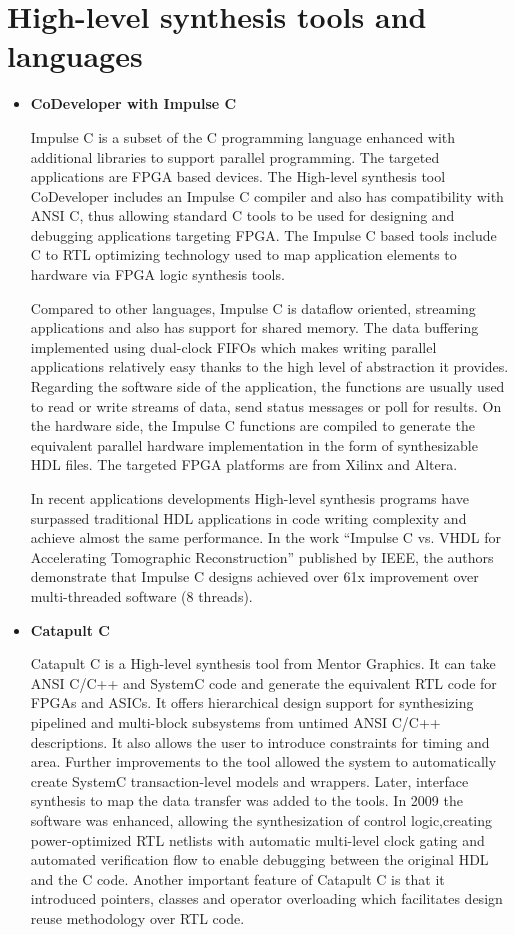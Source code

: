 \documentclass{cup-pan}
\begin{document}
\section{High-level synthesis tools and languages}
\label{sec:overview}
\begin{itemize}
    \item  \textbf{CoDeveloper with Impulse C}
    
    Impulse C is a subset of the C programming language enhanced with additional libraries to support parallel programming. The targeted applications are FPGA based devices. The High-level synthesis tool CoDeveloper includes an Impulse C compiler and also has compatibility with ANSI C, thus allowing standard C tools to be used for designing and debugging applications targeting FPGA. The Impulse C based tools include C to RTL optimizing technology used to map application elements to hardware via FPGA logic synthesis tools.
    
	Compared to other languages, Impulse C is dataflow oriented, streaming applications and also has support for shared memory. The data buffering implemented using dual-clock FIFOs which makes writing parallel applications relatively easy thanks to the high level of abstraction it provides. Regarding the software side of the application, the functions are usually used to read or write streams of data, send status messages or poll for results. On the hardware side, the Impulse C functions are compiled to generate the equivalent parallel hardware implementation in the form of synthesizable HDL files. The targeted FPGA platforms are from Xilinx and Altera.
	
	In recent applications developments High-level synthesis programs have surpassed traditional HDL applications in code writing complexity and achieve almost the same performance. In the work “Impulse C vs. VHDL for Accelerating Tomographic Reconstruction” published by IEEE, the authors demonstrate that Impulse C designs achieved over 61x improvement over multi-threaded software (8 threads).

    \item  \textbf{Catapult C}
    
    Catapult C is a High-level synthesis tool from Mentor Graphics. It can take ANSI C/C++ and SystemC code and generate the equivalent RTL code for FPGAs and ASICs. It offers hierarchical design support for synthesizing pipelined and multi-block subsystems from untimed ANSI C/C++ descriptions. It  also allows the user to introduce constraints for timing and area. Further improvements to the tool allowed the system to automatically create SystemC transaction-level models and wrappers. Later, interface synthesis to map the data transfer was added to the tools. In 2009 the software was enhanced, allowing the synthesization of control logic,creating power-optimized RTL netlists with automatic multi-level clock gating and automated verification flow to enable debugging between the original HDL and the C code. Another important feature of Catapult C is that it introduced pointers, classes and operator overloading which facilitates design reuse methodology over RTL code.
    

\end{itemize}
\end{document}
